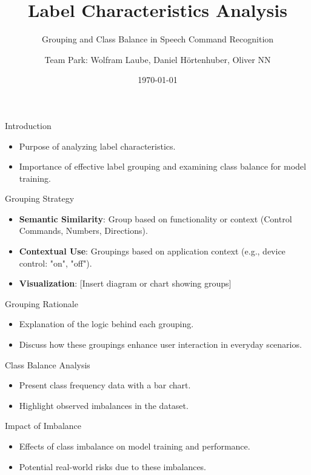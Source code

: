 \documentclass{beamer}
\title{Label Characteristics Analysis}
\subtitle{Grouping and Class Balance in Speech Command Recognition}
\author{Team Park: Wolfram Laube, Daniel Hörtenhuber, Oliver NN}
\institute{JKU \\ MLPC}
\date{\today}
\begin{document}
\begin{frame}
  \titlepage
\end{frame}

\begin{frame}{Introduction}
  \begin{itemize}
    \item Purpose of analyzing label characteristics.
    \item Importance of effective label grouping and examining class balance for model training.
  \end{itemize}
\end{frame}

\begin{frame}{Grouping Strategy}
  \begin{itemize}
    \item \textbf{Semantic Similarity}: Group based on functionality or context (Control Commands, Numbers, Directions).
    \item \textbf{Contextual Use}: Groupings based on application context (e.g., device control: "on", "off").
    \item \textbf{Visualization}: [Insert diagram or chart showing groups]
  \end{itemize}
\end{frame}

\begin{frame}{Grouping Rationale}
  \begin{itemize}
    \item Explanation of the logic behind each grouping.
    \item Discuss how these groupings enhance user interaction in everyday scenarios.
  \end{itemize}
\end{frame}

\begin{frame}{Class Balance Analysis}
  \begin{itemize}
    \item Present class frequency data with a bar chart.
    \item Highlight observed imbalances in the dataset.
  \end{itemize}
\end{frame}

\begin{frame}{Impact of Imbalance}
  \begin{itemize}
    \item Effects of class imbalance on model training and performance.
    \item Potential real-world risks due to these imbalances.
  \end{itemize}
\end{frame}
\end{document}
